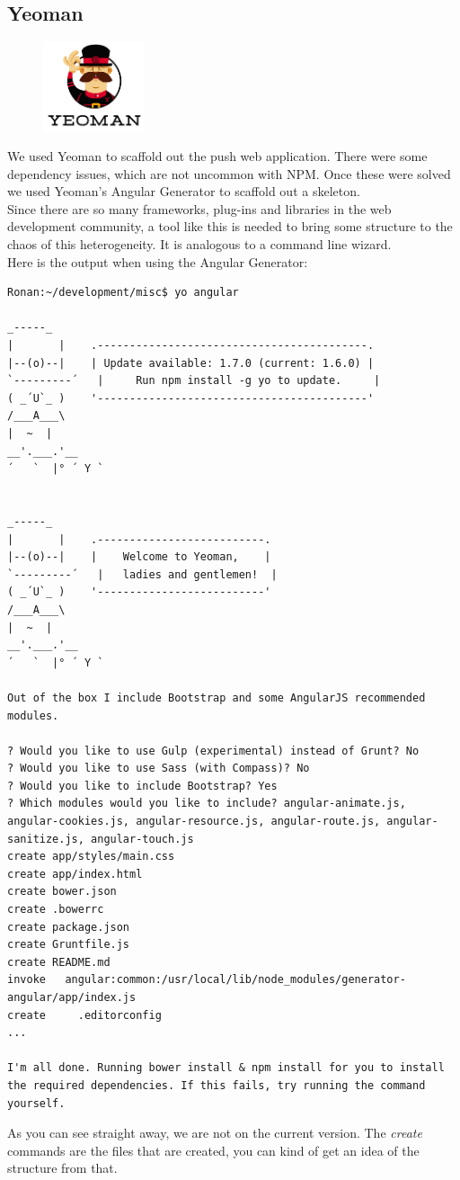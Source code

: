 \subsection{Yeoman}
\begin{figure}
\includegraphics[width=3cm]{img/mobile-app/logos/yeoman.png}
\end{figure}
\cite{yeoman}
We used Yeoman to scaffold out the push web application.  
There were some dependency issues, which are not uncommon with NPM.
Once these were solved we used Yeoman's Angular Generator \cite{angular_generator} to scaffold out a skeleton.
\\
Since there are so many frameworks, plug-ins and libraries in the web development community, a tool like this is needed to bring some structure to the chaos of this heterogeneity. It is analogous to a command line wizard.
 \\
 Here is the output when using the Angular Generator:
\begin{verbatim}
Ronan:~/development/misc$ yo angular

_-----_
|       |    .------------------------------------------.
|--(o)--|    | Update available: 1.7.0 (current: 1.6.0) |
`---------´   |     Run npm install -g yo to update.     |
( _´U`_ )    '------------------------------------------'
/___A___\
|  ~  |
__'.___.'__
´   `  |° ´ Y `


_-----_
|       |    .--------------------------.
|--(o)--|    |    Welcome to Yeoman,    |
`---------´   |   ladies and gentlemen!  |
( _´U`_ )    '--------------------------'
/___A___\
|  ~  |
__'.___.'__
´   `  |° ´ Y `

Out of the box I include Bootstrap and some AngularJS recommended modules.

? Would you like to use Gulp (experimental) instead of Grunt? No
? Would you like to use Sass (with Compass)? No
? Would you like to include Bootstrap? Yes
? Which modules would you like to include? angular-animate.js, angular-cookies.js, angular-resource.js, angular-route.js, angular-sanitize.js, angular-touch.js
create app/styles/main.css
create app/index.html
create bower.json
create .bowerrc
create package.json
create Gruntfile.js
create README.md
invoke   angular:common:/usr/local/lib/node_modules/generator-angular/app/index.js
create     .editorconfig
...

I'm all done. Running bower install & npm install for you to install the required dependencies. If this fails, try running the command yourself.
 \end{verbatim}
As you can see straight away, we are not on the current version.
The \textit{create} commands are the files that are created, you can kind of get an idea of the structure from that.
\\

